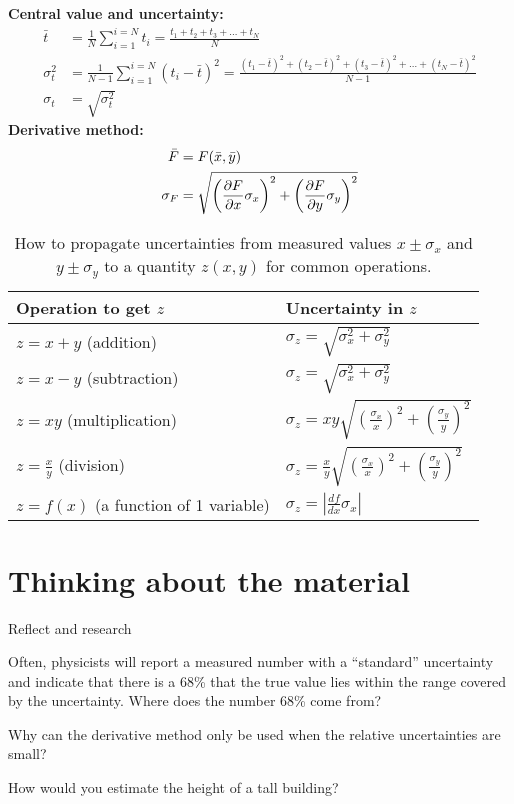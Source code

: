 \begin{importantEquations}
\textbf{Central value and uncertainty:}\\
\begin{align*}
\bar t &= \frac{1}{N}\sum_{i=1}^{i=N} t_i=\frac{t_1 +t_2 +t_3 +\dots+ t_N}{N} \\
\sigma_t^2 &=\frac{1}{N-1}\sum_{i=1}^{i=N}(t_i-\bar t)^2 = \frac{(t_1-\bar t)^2+(t_2-\bar t)^2+(t_3-\bar t)^2+\dots+(t_N-\bar t)^2}{N-1} \\
\sigma_t &=\sqrt{\sigma_t^2}
\end{align*}
\textbf{Derivative method:}\\
\begin{align*}
\bar F &= F(\bar x, \bar y) \nonumber \\
\sigma_F &= \sqrt{\left(\frac{\partial F}{\partial x}\sigma_x \right)^2 + \left(\frac{\partial F}{\partial y}\sigma_y \right)^2 }
\end{align*}
\begin{table}[H]
\centering
\begin{tabular}{p{2.5in}p{2in}} 
\textbf{Operation to get $z$} &\textbf{Uncertainty in $z$} \\
\hline
\hline
$z=x+y$ (addition) &  $\sigma_z=\sqrt{\sigma_x^2+\sigma_y^2}$ \\ \hline
$z=x-y$ (subtraction) & $\sigma_z=\sqrt{\sigma_x^2+\sigma_y^2}$ \\ \hline
$z=xy$ (multiplication) & $\sigma_z=xy\sqrt{\left(\frac{\sigma_x}{x}\right)^2+\left(\frac{\sigma_y}{y}\right)^2}$ \\ \hline
$z=\frac{x}{y}$ (division) & $\sigma_z=\frac{x}{y}\sqrt{\left(\frac{\sigma_x}{x}\right)^2+\left(\frac{\sigma_y}{y}\right)^2}$ \\ \hline
$z=f(x)$ (a function of 1 variable) &$\sigma_z=\left|\frac{df}{dx}\sigma_x \right|$ \\ \hline
\end{tabular}
\caption{\label{tab:modelandexperiment:prop_uncertainties} How to propagate uncertainties from measured values $x\pm\sigma_x$ and $y\pm\sigma_y$ to a quantity $z(x,y)$ for common operations.}
\end{table}
\end{importantEquations}
\newpage
\section{Thinking about the material}

\vspace{0.5cm}
\begin{chapteractivity}{Reflect and research}
{
\item Often, physicists will report a measured number with a ``standard'' uncertainty and indicate that there is a 68\% that the true value lies within the range covered by the uncertainty. Where does the number 68\% come from?
\item Why can the derivative method only be used when the relative uncertainties are small?
\item How would you estimate the height of a tall building?
}
\end{chapteractivity}


